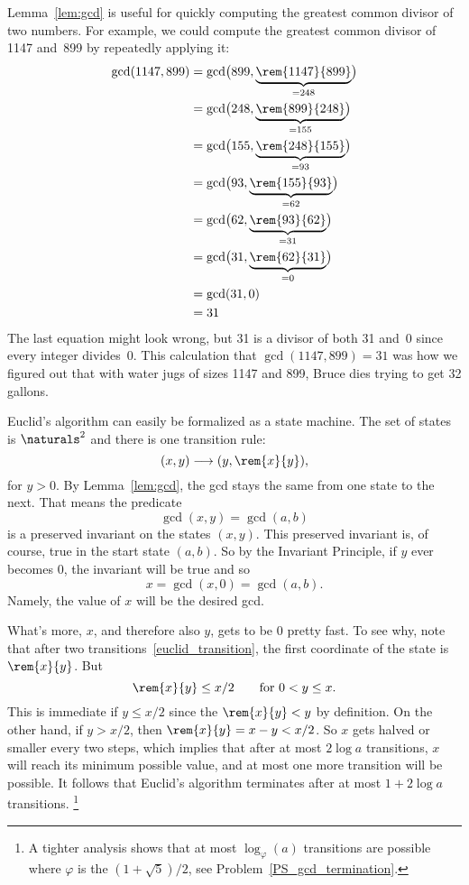 Lemma~\ref{lem:gcd} is useful for quickly computing the greatest
common divisor of two numbers.  For example, we could compute the
greatest common divisor of 1147 and~899 by repeatedly applying it:
\begin{align*}
\gcd(1147, 899)
    &= \gcd\bigl(899, \underbrace{\rem{1147}{899}}_{{} = 248}\bigr) \\
    &= \gcd\bigl(248, \underbrace{\rem{899}{248}}_{{} = 155}\bigr) \\
    &= \gcd\bigl(155, \underbrace{\rem{248}{155}}_{{} = 93}\bigr) \\
    &= \gcd\bigl(93,  \underbrace{\rem{155}{93}}_{{} = 62}\bigr) \\
    &= \gcd\bigl(62,  \underbrace{\rem{93}{62}}_{{} = 31}\bigr) \\
    &= \gcd\bigl(31,  \underbrace{\rem{62}{31}}_{{} = 0}\bigr) \\
    &= \gcd(31, 0) \\
    &= 31
\end{align*}
The last equation might look wrong, but 31 is a divisor of both 31
and~0 since every integer divides~0.  This calculation that
$\gcd(1147, 899) = 31$ was how we figured out that with water jugs of
sizes 1147 and 899, Bruce dies trying to get 32 gallons.

Euclid's algorithm can easily be formalized as a state machine.  The
set of states is $\naturals^2$ and there is one transition rule:
\begin{equation}\label{euclid_transition}
(x,y) \movesto (y, \rem{x}{y}),
\end{equation}
for $y>0$.  By Lemma~\ref{lem:gcd}, the gcd stays the same from one
state to the next.  That means the predicate
\[
\gcd(x,y) = \gcd(a,b)
\]
is a preserved invariant on the states $(x,y)$.  This preserved
invariant is, of course, true in the start state $(a,b)$.  So by the
Invariant Principle, if $y$ ever becomes $0$, the invariant will be
true and so
\[
x = \gcd(x,0) = \gcd(a,b).
\]
Namely, the value of $x$ will be the desired gcd.

What's more, $x$, and therefore also $y$, gets to be 0 pretty fast.
To see why, note that after two transitions~\eqref{euclid_transition},
the first coordinate of the state is $\rem{x}{y}$.  But
\begin{equation}\label{rxylx2}
\rem{x}{y} \le x/2 \qquad \text{for $0 < y \le x$}.
\end{equation}
This is immediate if $y \le x/2$ since the $\rem{x}{y}<y$ by
definition.  On the other hand, if $y > x/2$, then $\rem{x}{y} =
x - y < x/2$.  So $x$ gets halved or smaller every two steps, which
implies that after at most $2 \log a$ transitions, $x$ will reach its
minimum possible value, and at most one more transition will be
possible.  It follows that Euclid's algorithm terminates after at most
$1+2 \log a$ transitions.
\footnote{A tighter analysis shows that at most $\log_\varphi(a)$
  transitions are possible where $\varphi$ is the 
  $(1 + \sqrt{5})/2$, see Problem~\ref{PS_gcd_termination}.}

